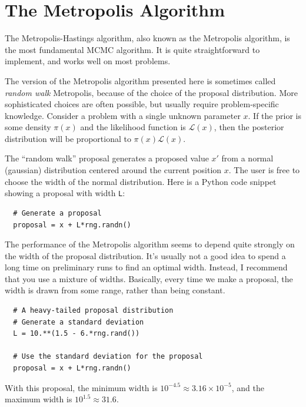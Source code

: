 \section{The Metropolis Algorithm}
The Metropolis-Hastings algorithm, also known as the Metropolis algorithm, is
the most fundamental MCMC algorithm. It is quite straightforward to implement,
and works well on most problems.

The version of the Metropolis algorithm presented here is sometimes called
{\it random walk} Metropolis, because of the choice of the proposal
distribution. More sophisticated choices are often possible, but usually
require problem-specific knowledge. Consider a problem with a single unknown
parameter $x$. If the prior is some density $\pi(x)$ and the likelihood
function is $\mathcal{L}(x)$, then the posterior distribution will be
proportional to $\pi(x)\mathcal{L}(x)$.

The ``random walk'' proposal generates a proposed value $x'$ from a normal
(gaussian) distribution centered around the current position $x$. The user
is free to choose the width of the normal distribution. Here is a Python code
snippet showing a proposal with width {\tt L}:

\begin{verbatim}
  # Generate a proposal
  proposal = x + L*rng.randn()
\end{verbatim}

The performance of the Metropolis algorithm seems to depend quite strongly on
the width of the proposal distribution. It's usually not a good idea to spend
a long time on preliminary runs to find an optimal width. Instead, I recommend
that you use a mixture of widths. Basically, every time we make a proposal,
the width is drawn from some range, rather than being constant.
\begin{verbatim}
  # A heavy-tailed proposal distribution
  # Generate a standard deviation
  L = 10.**(1.5 - 6.*rng.rand())

  # Use the standard deviation for the proposal
  proposal = x + L*rng.randn()
\end{verbatim}

With this proposal, the minimum width is
$10^{-4.5} \approx 3.16 \times 10^{-5}$, and the maximum width is
$10^{1.5} \approx 31.6$.

